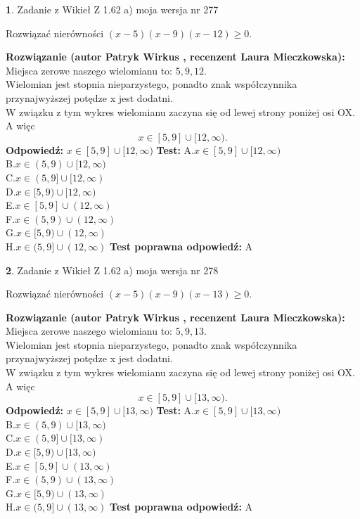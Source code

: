 \documentclass[12pt, a4paper]{article}
\theoremstyle{definition} %
\newtheorem{zad}{}
\newcommand{\zadStart}[1]{\begin{zad}#1\newline}
\newcommand{\zadStop}{\end{zad}}
\newcommand{\rozwStart}[2]{\noindent \textbf{Rozwiązanie (autor #1 , recenzent #2): }\newline}
\newcommand{\rozwStop}{\newline}
\newcommand{\odpStart}{\noindent \textbf{Odpowiedź:}\newline}
\newcommand{\odpStop}{\newline}
\newcommand{\testStart}{\noindent \textbf{Test:}\newline}
\newcommand{\testStop}{\newline}
\newcommand{\kluczStart}{\noindent \textbf{Test poprawna odpowiedź:}\newline}
\newcommand{\kluczStop}{\newline}
\begin{document}
\zadStart{Zadanie z Wikieł Z 1.62 a) moja wersja nr 277}

Rozwiązać nierówności $(x-5)(x-9)(x-12)\ge0$.
\zadStop
\rozwStart{Patryk Wirkus}{Laura Mieczkowska}
Miejsca zerowe naszego wielomianu to: $5, 9, 12$.\\
Wielomian jest stopnia nieparzystego, ponadto znak współczynnika przy\linebreak najwyższej potędze x jest dodatni.\\ W związku z tym wykres wielomianu zaczyna się od lewej strony poniżej osi OX. A więc $$x \in [5,9] \cup [12,\infty).$$
\rozwStop
\odpStart
$x \in [5,9] \cup [12,\infty)$
\odpStop
\testStart
A.$x \in [5,9] \cup [12,\infty)$\\
B.$x \in (5,9) \cup [12,\infty)$\\
C.$x \in (5,9] \cup [12,\infty)$\\
D.$x \in [5,9) \cup [12,\infty)$\\
E.$x \in [5,9] \cup (12,\infty)$\\
F.$x \in (5,9) \cup (12,\infty)$\\
G.$x \in [5,9) \cup (12,\infty)$\\
H.$x \in (5,9] \cup (12,\infty)$
\testStop
\kluczStart
A
\kluczStop



\zadStart{Zadanie z Wikieł Z 1.62 a) moja wersja nr 278}

Rozwiązać nierówności $(x-5)(x-9)(x-13)\ge0$.
\zadStop
\rozwStart{Patryk Wirkus}{Laura Mieczkowska}
Miejsca zerowe naszego wielomianu to: $5, 9, 13$.\\
Wielomian jest stopnia nieparzystego, ponadto znak współczynnika przy\linebreak najwyższej potędze x jest dodatni.\\ W związku z tym wykres wielomianu zaczyna się od lewej strony poniżej osi OX. A więc $$x \in [5,9] \cup [13,\infty).$$
\rozwStop
\odpStart
$x \in [5,9] \cup [13,\infty)$
\odpStop
\testStart
A.$x \in [5,9] \cup [13,\infty)$\\
B.$x \in (5,9) \cup [13,\infty)$\\
C.$x \in (5,9] \cup [13,\infty)$\\
D.$x \in [5,9) \cup [13,\infty)$\\
E.$x \in [5,9] \cup (13,\infty)$\\
F.$x \in (5,9) \cup (13,\infty)$\\
G.$x \in [5,9) \cup (13,\infty)$\\
H.$x \in (5,9] \cup (13,\infty)$
\testStop
\kluczStart
A
\kluczStop
\end{document}
